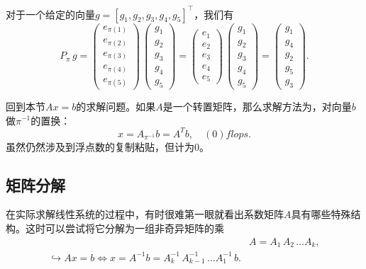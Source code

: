 对于一个给定的向量$g = \left[ g_{1}, g_{2}, g_{3}, g_{4}, g_{5} \right]^{\top}$，我们有
\begin{equation*}
  P_{\pi} \, g =
  \begin{pmatrix}
    e_{\pi(1)} \\
    e_{\pi(2)} \\
    e_{\pi(3)} \\
    e_{\pi(4)} \\
    e_{\pi(5)}
  \end{pmatrix}
  \,
  \begin{pmatrix}
    g_{1} \\
    g_{2} \\
    g_{3} \\
    g_{4} \\
    g_{5}
    \end{pmatrix}
    =
    \begin{pmatrix}
    e_{1} \\ e_{2} \\ e_{3} \\ e_{4} \\ e_{5}
    \end{pmatrix}
    \,
    \begin{pmatrix}
      g_{1} \\
      g_{2} \\
      g_{3} \\
      g_{4} \\
      g_{5}
      \end{pmatrix}
    = \begin{pmatrix}
    g_{1} \\ g_{4} \\ g_{2} \\ g_{5} \\ g_{3}
    \end{pmatrix}.
\end{equation*}

回到本节$Ax=b$的求解问题。如果$A$是一个转置矩阵，那么求解方法为，对向量$b$做$\pi^{-1}$的置换：
\begin{equation*}
  x = A_{\pi^{-1}} b = A^{T} b, \quad \left( 0 \right) flops.
\end{equation*}
虽然仍然涉及到浮点数的复制粘贴，但计为$0$。

\subsection{矩阵分解}
\label{sec:numlin-matrix-factorization}
在实际求解线性系统的过程中，有时很难第一眼就看出系数矩阵$A$具有哪些特殊结构。这时可以尝试将它分解为一组非奇异矩阵的乘
\begin{equation}
  \label{eq:numlin-matrix-factorization-fact-step}
\begin{split}
    & A = A_{1} \, A_{2} \, \ldots A_{k}, \\
    \hookrightarrow A x = b \Leftrightarrow x = A^{-1} b
    = A_{k}^{-1} \, A_{k-1}^{-1} \, \ldots A_{1}^{-1} \, b.
\end{split}
\end{equation}

